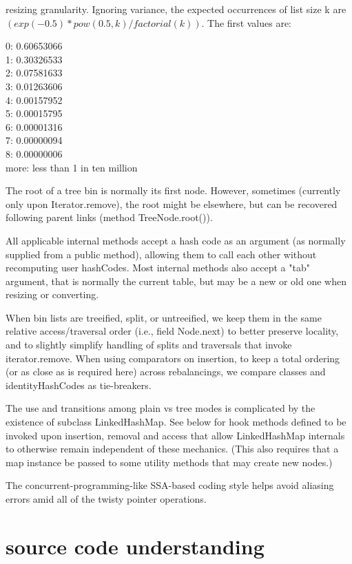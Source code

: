 \documentclass[UTF8,11pt]{ctexbook}
\begin{document}
	resizing granularity. Ignoring variance, the expected
	occurrences of list size k are $(exp(-0.5) * pow(0.5, k) /
	factorial(k))$. The first values are:
	\par 
	0:    0.60653066\\
	1:    0.30326533\\
	2:    0.07581633\\
	3:    0.01263606\\
	4:    0.00157952\\
	5:    0.00015795\\
	6:    0.00001316\\
	7:    0.00000094\\
	8:    0.00000006\\
	more: less than 1 in ten million
	\par
	
	The root of a tree bin is normally its first node.  However,
	sometimes (currently only upon Iterator.remove), the root might
	be elsewhere, but can be recovered following parent links
	(method TreeNode.root()).
	
	All applicable internal methods accept a hash code as an
	argument (as normally supplied from a public method), allowing
	them to call each other without recomputing user hashCodes.
	Most internal methods also accept a "tab" argument, that is
	normally the current table, but may be a new or old one when
	resizing or converting.
	
	When bin lists are treeified, split, or untreeified, we keep
	them in the same relative access/traversal order (i.e., field
	Node.next) to better preserve locality, and to slightly
	simplify handling of splits and traversals that invoke
	iterator.remove. When using comparators on insertion, to keep a
	total ordering (or as close as is required here) across
	rebalancings, we compare classes and identityHashCodes as
	tie-breakers.
	
	The use and transitions among plain vs tree modes is
	complicated by the existence of subclass LinkedHashMap. See
	below for hook methods defined to be invoked upon insertion,
	removal and access that allow LinkedHashMap internals to
	otherwise remain independent of these mechanics. (This also
	requires that a map instance be passed to some utility methods
	that may create new nodes.)
	
	The concurrent-programming-like SSA-based coding style helps
	avoid aliasing errors amid all of the twisty pointer operations.
	
\section{source code understanding}
\end{document}

